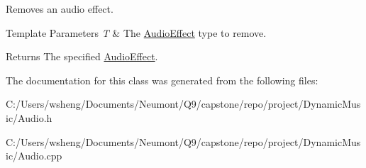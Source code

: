 Removes an audio effect. 


\begin{DoxyTemplParams}{Template Parameters}
{\em T} & The \hyperlink{class_audio_effect}{Audio\+Effect} type to remove. \\
\hline
\end{DoxyTemplParams}
\begin{DoxyReturn}{Returns}
The specified \hyperlink{class_audio_effect}{Audio\+Effect}. 
\end{DoxyReturn}


The documentation for this class was generated from the following files\+:\begin{DoxyCompactItemize}
\item 
C\+:/\+Users/wsheng/\+Documents/\+Neumont/\+Q9/capstone/repo/project/\+Dynamic\+Music/Audio.\+h\item 
C\+:/\+Users/wsheng/\+Documents/\+Neumont/\+Q9/capstone/repo/project/\+Dynamic\+Music/Audio.\+cpp\end{DoxyCompactItemize}
